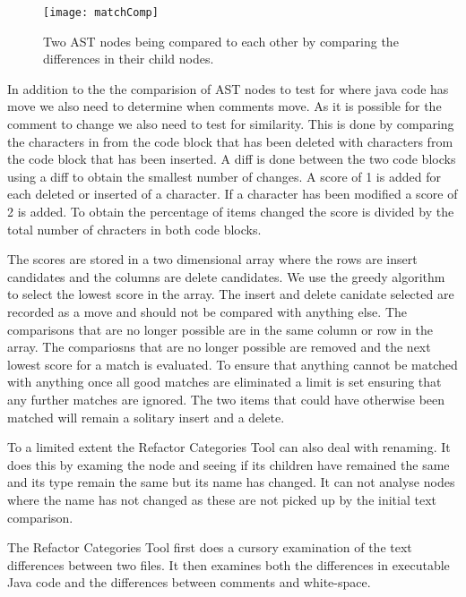\begin{figure}[!t]
 \begin{center}
 \texttt{[image: matchComp]}
 \end{center}
 \caption{Two AST nodes being compared to each other by comparing the differences in their child nodes.}
 \label{fig:matchComp}
\end{figure}


In addition to the the comparision of AST nodes to test for where java code has move we also need to determine when comments move.  As it is possible for the comment to change we also need to test for similarity.  This is done by comparing the characters in from the code block that has been deleted with characters from the code block that has been inserted.  A diff is done between the two code blocks using a diff to obtain the smallest number of changes. A score of 1 is added for each deleted or inserted of a character.  If a character has been modified a score of 2 is added. To obtain the percentage of items changed the score is divided by the total number of chracters in both code blocks.


The scores are stored in a two dimensional array where the rows are insert candidates and the columns are delete candidates.  We use the greedy algorithm to select the lowest score in the array.  The insert and delete canidate selected are recorded as a move and should not be compared with anything else. The comparisons that are no longer possible are in the same column or row in the array.  The compariosns that are no longer possible are removed and the next lowest score for a match is evaluated.  To ensure that anything cannot be matched with anything once all good matches are eliminated a limit is set ensuring that any further matches are ignored.  The two items that could have otherwise been matched will remain a solitary insert and a delete.

To a limited extent the Refactor Categories Tool can also deal with renaming. It does this by examing the node and seeing if its children have remained the same and its type remain the same but its name has changed. It can not analyse nodes where the name has not changed as these are not picked up by the initial text comparison.

The Refactor Categories Tool first does a cursory examination of the text differences between two files. It then examines both the differences in executable Java code and the differences between comments and white-space. 


